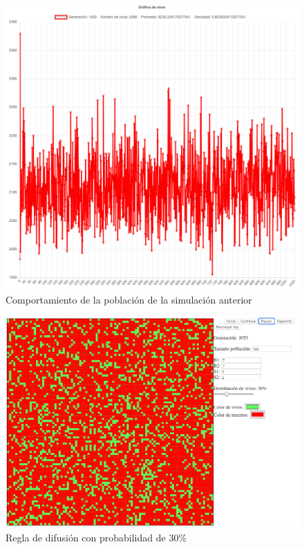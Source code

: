 	\begin{figure}[H]
		\begin{center}
			\includegraphics[scale=.24]{GOL/img/dif20-2.png}
			\caption{Comportamiento de la población de la simulación anterior}
			\label{fig:gol5}
		\end{center}
	\end{figure}

	\begin{figure}[H]
		\begin{center}
			\includegraphics[scale=.3]{GOL/img/dif30-1.png}
			\caption{Regla de difusión con probabilidad de 30\%}
			\label{fig:gol5}
		\end{center}
	\end{figure}

